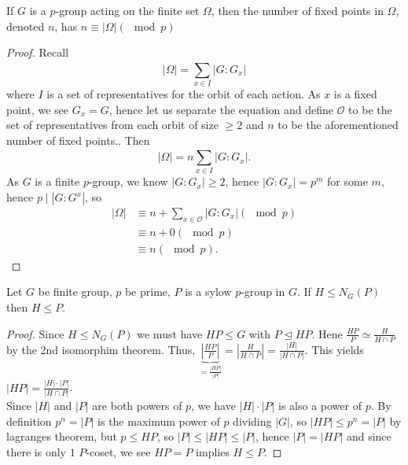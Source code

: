 \begin{lemma}
	If \(G\) is a \(p\)-group acting on the finite set \(\Omega\), then the number of fixed points in \(\Omega\), denoted \(n\), has \(n \equiv \left| \Omega \right| (\mod p)\)
\end{lemma}
\begin{proof}
	Recall \[
	\left| \Omega \right|  = \sum_{ x\in I}^{} \left| G : G_{x} \right|
	\]  where \(I\) is a set of representatives for the orbit of each action. As \(x\) is a fixed point, we see \(G_{x} = G\), hence let us separate the equation and define \(\mathscr{O}\) to be the set of representatives from each orbit of size \(\ge 2\) and \(n\) to be the aforementioned number of fixed points.. Then \[
	\left| \Omega \right|  = n \sum_{ x\in I}^{} \left| G : G_{x} \right|
	.\]
As \(G\) is a finite \(p\)-group, we know \(\left| G:G_{x} \right| \ge 2\), hence \(\left| G : G_{x} \right| = p^{m}\) for some \(m\), hence \(p \mid \left| G:G^{x} \right| \), so
\begin{align*}
	\left| \Omega \right|  &\equiv n + \sum_{x \in \mathscr{O}}^{} \left| G : G_{x} \right| \left( \mod p \right) \\
			       &\equiv n + 0 \left( \mod p \right) \\
			       &\equiv n \left( \mod p \right)
.\end{align*}
\end{proof}
\begin{lemma}
	Let \(G\) be  finite group, \(p\) be prime, \(P\) is a sylow \(p\)-group in \(G\). If \(H \le N_{G}\left( P \right) \) then \(H \le P\).
\end{lemma}
\begin{proof}
	Since \(H \le N_{G}\left( P \right) \)	 we must have \(HP \le G\) with \(P \trianglelefteq HP\). Hene \(\frac{HP}{P} \simeq \frac{H}{H \cap P}\) by the 2nd isomorphim theorem. Thus, \(\underbrace{\left| \frac{HP}{P} \right|}_{= \frac{\left| HP \right| }{\left| P \right| }}  = \left| \frac{H}{H \cap P} \right|  = \frac{\left| H \right| }{\left| H \cap P \right| }\). This yields \(\left| HP \right|  = \frac{\left| H \right| \cdot \left| P \right| }{\left| H \cap P \right| }\).\\
	Since \(\left| H \right| \) and \(\left| P \right| \) are both powers of \(p\), we have \(\left| H \right|  \cdot \left| P \right| \) is also a power of \(p\). By definition \(p^{n} = \left| P \right| \) is the maximum power of \(p\) dividing \(\left| G \right| \), so \(\left| HP \right|  \le p^{n} = \left| P \right| \) by lagranges theorem, but \(p \le HP\), so \(\left| P \right| \le \left| HP \right| \le \left| P \right| \), hence \(\left| P \right|  = \left| HP \right| \) and since there is only \(1\) \(P\)-coset, we see \(HP = P\) implies \(H \le P\).
\end{proof}
